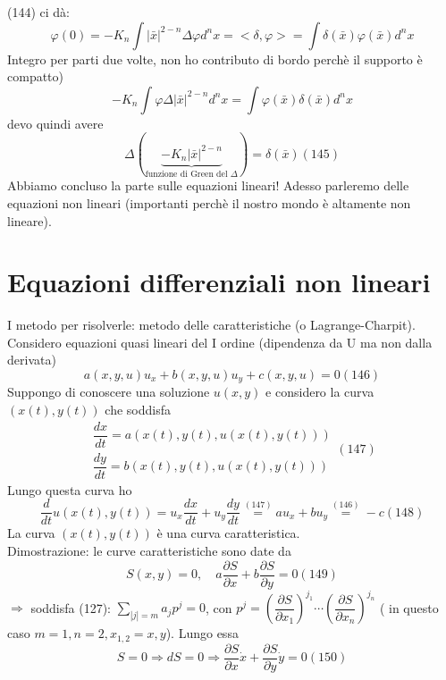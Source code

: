 \documentclass[a4paper,11pt]{report}
\newcommand{\x}{\bar{x}}
\begin{document}
(144) ci dà: 
$$
\varphi(0)=-K_n\int |\x|^{2-n}\Delta \varphi d^n x=<\delta,\varphi>=\int \delta(\x)\varphi(\x)d^n x
$$
Integro per parti due volte, non ho contributo di bordo perchè il supporto è compatto)
$$
-K_n\int\varphi \Delta |\x|^{2-n}d^nx=\int \varphi(\x)\delta(\x) d^nx
$$
devo quindi avere
\begin{equation}
\Delta(\underset{\text{funzione di Green del }\Delta}{\underbrace{-K_n|\x|^{2-n}}})=\delta(\x) (145)
\end{equation}
Abbiamo concluso la parte sulle equazioni lineari! Adesso parleremo delle equazioni non lineari (importanti perchè il nostro mondo è altamente non lineare).

\section{Equazioni differenziali non lineari}
I metodo per risolverle: metodo delle caratteristiche (o Lagrange-Charpit).\\
Considero equazioni quasi lineari del I ordine (dipendenza da U ma non dalla derivata)
\begin{equation}
a(x,y,u)u_x + b(x,y,u)u_y + c(x,y,u)=0 (146)
\end{equation}
Suppongo di conoscere una soluzione $u(x,y)$ e considero la curva $(x(t),y(t))$ che soddisfa
\begin{equation}
\begin{matrix}
\dfrac{dx}{dt}=a(x(t),y(t),u(x(t),y(t))) \\
\dfrac{dy}{dt}=b(x(t),y(t),u(x(t),y(t)))
\end{matrix} (147)
\end{equation}
Lungo questa curva ho 
\begin{equation}
\dfrac{d}{dt}u(x(t),y(t))=u_x \dfrac{dx}{dt} + u_y\dfrac{dy}{dt}\overset{(147)}{=}au_x + bu_y \overset{(146)}{=}-c (148)
\end{equation}
La curva $(x(t),y(t))$ è una curva caratteristica.\\
Dimostrazione: le curve caratteristiche sono date da 
\begin{equation}
S(x,y)=0,\quad a\dfrac{\partial S}{\partial x} + b\dfrac{\partial S}{\partial y}=0 (149)
\end{equation}
$\Rightarrow$ soddisfa (127): $\sum_{|j|=m} a_jp^j =0$, con $p^j=\left(\dfrac{\partial S}{\partial x_1}\right)^{j_1}\cdots\left(\dfrac{\partial S}{\partial x_n}\right)^{j_n}$ ( in questo caso $m=1,n=2,x_{1,2}=x,y$). Lungo essa 
\begin{equation}
S=0 \Rightarrow dS=0 \Rightarrow \dfrac{\partial S}{\partial x}\dot{x}+\dfrac{\partial S}{\partial y}\dot{y} =0 (150)
\end{equation}
\end{document}
